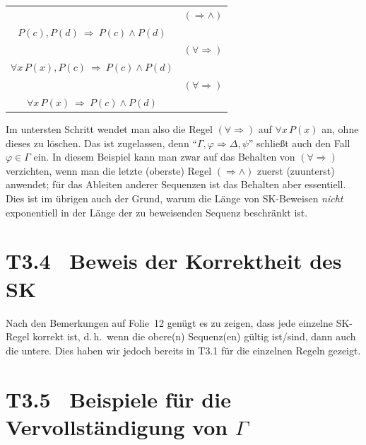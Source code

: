 \documentclass[fontsize=11pt, twoside=false, numbers=autoenddot]{scrbook}
\begin{document}
\begin{enumerate}
\begin{center}
\begin{tabular}{cccl}
        \multicolumn{3}{c}{\hrulefill}                                           & $(\Rightarrow\land)$   \\[-2pt]
        \multicolumn{3}{c}{$P(c),P(d) ~\Rightarrow~ P(c) \land P(d)$}            &                        \\[-6pt]
        \multicolumn{3}{c}{\hrulefill}                                           & $(\forall\Rightarrow)$ \\[-2pt]
        \multicolumn{3}{c}{$\forall x\,P(x),P(c) ~\Rightarrow~ P(c) \land P(d)$} &                        \\[-6pt]
        \multicolumn{3}{c}{\hrulefill}                                           & $(\forall\Rightarrow)$ \\[-2pt]
        \multicolumn{3}{c}{$\forall x\,P(x) ~\Rightarrow~ P(c) \land P(d)$}      &
      \end{tabular}
    \end{center}
    \par\smallskip
    Im untersten Schritt wendet man also die Regel $(\forall\Rightarrow)$ auf $\forall x\,P(x)$ an, ohne dieses zu löschen.
    Das ist zugelassen, denn "`$\Gamma,\varphi \Rightarrow \Delta,\psi$"' schließt auch den Fall $\varphi \in \Gamma$ ein.
    In diesem Beispiel kann man zwar auf das Behalten von $(\forall\Rightarrow)$ verzichten,
    wenn man die letzte (oberste) Regel $(\Rightarrow\land)$ zuerst (zuunterst) anwendet;
    für das  Ableiten anderer Sequenzen ist das Behalten aber essentiell.
    Dies ist im übrigen auch der Grund, warum die Länge von SK-Beweisen
    \emph{nicht} exponentiell in der Länge der zu beweisenden Sequenz beschränkt ist.
\end{enumerate}

\section*{T3.4~ Beweis der Korrektheit des SK}

Nach den Bemerkungen auf Folie~12 genügt es zu zeigen, dass jede einzelne SK-Regel korrekt ist,
d.\,h.\ wenn die obere(n) Sequenz(en) gültig ist/sind, dann auch die untere.
Dies haben wir jedoch bereits in T3.1 für die einzelnen Regeln gezeigt.

\section*{T3.5~ Beispiele für die Vervollständigung von {\boldmath $\Gamma$}}
\end{document}

